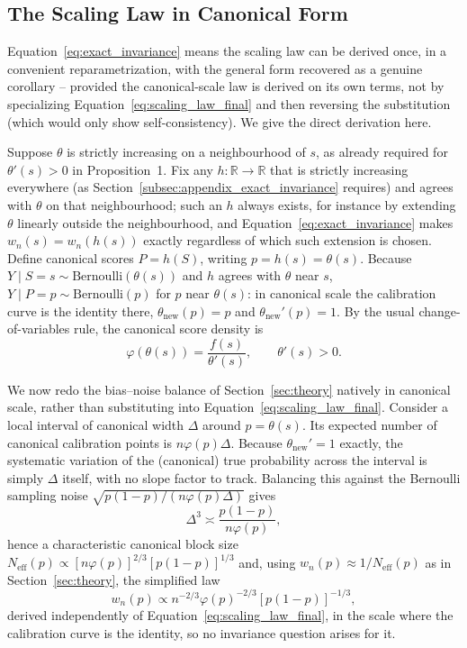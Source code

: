 \documentclass[11pt]{article}
\begin{document}
	\subsection{The Scaling Law in Canonical Form}

	Equation~\ref{eq:exact_invariance} means the scaling law can be derived once, in a convenient reparametrization, with the general form recovered as a genuine corollary -- provided the canonical-scale law is derived on its own terms, not by specializing Equation~\ref{eq:scaling_law_final} and then reversing the substitution (which would only show self-consistency). We give the direct derivation here.

	Suppose $\theta$ is strictly increasing on a neighbourhood of $s$, as already required for $\theta'(s)>0$ in Proposition~1. Fix any $h:\mathbb{R}\to\mathbb{R}$ that is strictly increasing everywhere (as Section~\ref{subsec:appendix_exact_invariance} requires) and agrees with $\theta$ on that neighbourhood; such an $h$ always exists, for instance by extending $\theta$ linearly outside the neighbourhood, and Equation~\ref{eq:exact_invariance} makes $w_n(s)=w_n(h(s))$ exactly regardless of which such extension is chosen. Define canonical scores $P=h(S)$, writing $p=h(s)=\theta(s)$. Because $Y\mid S=s\sim\text{Bernoulli}(\theta(s))$ and $h$ agrees with $\theta$ near $s$, $Y\mid P=p\sim\text{Bernoulli}(p)$ for $p$ near $\theta(s)$: in canonical scale the calibration curve is the identity there, $\theta_{\text{new}}(p)=p$ and $\theta_{\text{new}}'(p)=1$. By the usual change-of-variables rule, the canonical score density is
	\begin{equation}
		\varphi(\theta(s)) = \frac{f(s)}{\theta'(s)}, \qquad \theta'(s)>0.
		\label{eq:canonical_density}
	\end{equation}

	We now redo the bias--noise balance of Section~\ref{sec:theory} natively in canonical scale, rather than substituting into Equation~\ref{eq:scaling_law_final}. Consider a local interval of canonical width $\Delta$ around $p=\theta(s)$. Its expected number of canonical calibration points is $n\varphi(p)\Delta$. Because $\theta_{\text{new}}'=1$ exactly, the systematic variation of the (canonical) true probability across the interval is simply $\Delta$ itself, with no slope factor to track. Balancing this against the Bernoulli sampling noise $\sqrt{p(1-p)/(n\varphi(p)\Delta)}$ gives
	\begin{equation}
		\Delta^3 \asymp \frac{p(1-p)}{n\varphi(p)},
		\label{eq:canonical_delta}
	\end{equation}
	hence a characteristic canonical block size $N_{\mathrm{eff}}(p)\propto[n\varphi(p)]^{2/3}[p(1-p)]^{1/3}$ and, using $w_n(p)\approx1/N_{\mathrm{eff}}(p)$ as in Section~\ref{sec:theory}, the simplified law
	\begin{equation}
		w_n(p) \propto n^{-2/3}\varphi(p)^{-2/3}[p(1-p)]^{-1/3},
		\label{eq:simplified_law}
	\end{equation}
	derived independently of Equation~\ref{eq:scaling_law_final}, in the scale where the calibration curve is the identity, so no invariance question arises for it.
\end{document}
